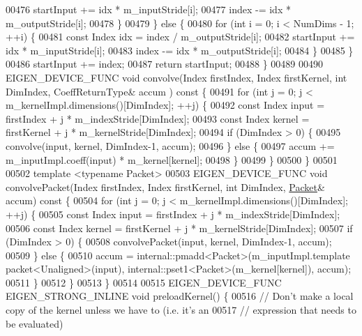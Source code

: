 \begin{DoxyCode}
00476         startInput += idx * m\_inputStride[i];
00477         index -= idx * m\_outputStride[i];
00478       \}
00479     \} \textcolor{keywordflow}{else} \{
00480       \textcolor{keywordflow}{for} (\textcolor{keywordtype}{int} i = 0; i < NumDims - 1; ++i) \{
00481         \textcolor{keyword}{const} Index idx = index / m\_outputStride[i];
00482         startInput += idx * m\_inputStride[i];
00483         index -= idx * m\_outputStride[i];
00484       \}
00485     \}
00486     startInput += index;
00487     \textcolor{keywordflow}{return} startInput;
00488   \}
00489 
00490   EIGEN\_DEVICE\_FUNC \textcolor{keywordtype}{void} convolve(Index firstIndex, Index firstKernel, \textcolor{keywordtype}{int} DimIndex, CoeffReturnType& accum
      )\textcolor{keyword}{ const }\{
00491     \textcolor{keywordflow}{for} (\textcolor{keywordtype}{int} j = 0; j < m\_kernelImpl.dimensions()[DimIndex]; ++j) \{
00492       \textcolor{keyword}{const} Index input = firstIndex + j * m\_indexStride[DimIndex];
00493       \textcolor{keyword}{const} Index kernel = firstKernel + j * m\_kernelStride[DimIndex];
00494       \textcolor{keywordflow}{if} (DimIndex > 0) \{
00495         convolve(input, kernel, DimIndex-1, accum);
00496       \} \textcolor{keywordflow}{else} \{
00497         accum += m\_inputImpl.coeff(input) * m\_kernel[kernel];
00498       \}
00499     \}
00500   \}
00501 
00502   \textcolor{keyword}{template} <\textcolor{keyword}{typename} Packet>
00503   EIGEN\_DEVICE\_FUNC \textcolor{keywordtype}{void} convolvePacket(Index firstIndex, Index firstKernel, \textcolor{keywordtype}{int} DimIndex, 
      \hyperlink{group___sparse_core___module}{Packet}& accum)\textcolor{keyword}{ const }\{
00504     \textcolor{keywordflow}{for} (\textcolor{keywordtype}{int} j = 0; j < m\_kernelImpl.dimensions()[DimIndex]; ++j) \{
00505       \textcolor{keyword}{const} Index input = firstIndex + j * m\_indexStride[DimIndex];
00506       \textcolor{keyword}{const} Index kernel = firstKernel + j * m\_kernelStride[DimIndex];
00507       \textcolor{keywordflow}{if} (DimIndex > 0) \{
00508         convolvePacket(input, kernel, DimIndex-1, accum);
00509       \} \textcolor{keywordflow}{else} \{
00510         accum = internal::pmadd<Packet>(m\_inputImpl.template packet<Unaligned>(input), 
      internal::pset1<Packet>(m\_kernel[kernel]), accum);
00511       \}
00512     \}
00513   \}
00514 
00515   EIGEN\_DEVICE\_FUNC EIGEN\_STRONG\_INLINE \textcolor{keywordtype}{void} preloadKernel() \{
00516     \textcolor{comment}{// Don't make a local copy of the kernel unless we have to (i.e. it's an}
00517     \textcolor{comment}{// expression that needs to be evaluated)}

\end{DoxyCode}
